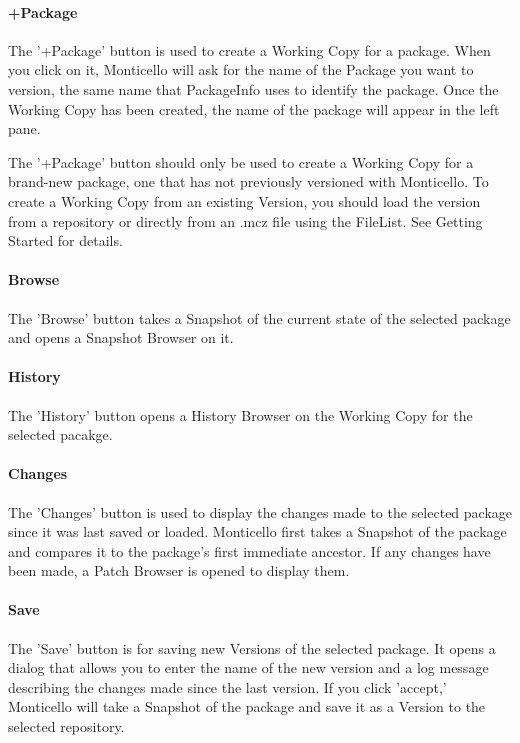 \documentclass[a4paper,10pt,twoside]{book}
\begin{document}
\paragraph{+Package}

The '+Package' button is used to create a Working Copy for a package. When you click on it, Monticello will ask for the name of the Package you want to version, the same name that PackageInfo uses to identify the package. Once the Working Copy has been created, the name of the package will appear in the left pane.

The '+Package' button should only be used to create a Working Copy for a brand-new package, one that has not previously versioned with Monticello. To create a Working Copy from an existing Version, you should load the version from a repository or directly from an .mcz file using the FileList. See Getting Started for details.

\paragraph{Browse}

The 'Browse' button takes a Snapshot of the current state of the selected package and opens a Snapshot Browser on it.

\paragraph{History}

The 'History' button opens a History Browser on the Working Copy for the selected pacakge.

\paragraph{Changes}

The 'Changes' button is used to display the changes made to the selected package since it was last saved or loaded. Monticello first takes a Snapshot of the package and compares it to the package's first immediate ancestor. If any changes have been made, a Patch Browser is opened to display them.

\paragraph{Save}

The 'Save' button is for saving new Versions of the selected package. It opens a dialog that allows you to enter the name of the new version and a log message describing the changes made since the last version. If you click 'accept,' Monticello will take a Snapshot of the package and save it as a Version to the selected repository.
\end{document}
